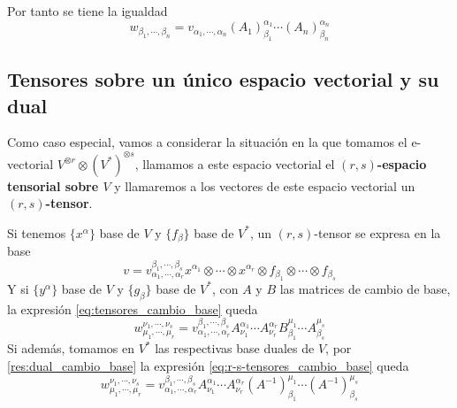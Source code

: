 Por tanto se tiene la igualdad
\begin{equation}
  \label{eq:tensores_cambio_base}
  w_{\beta_1,\cdots,\beta_n}=v_{\alpha_1,\cdots,\alpha_n}(A_1)^{\alpha_1}_{\beta_1}\cdots (A_n)^{\alpha_n}_{\beta_n}
\end{equation}

\subsection{Tensores sobre un único espacio vectorial y su dual}\label{subsec:tensores-sobre-un-único-espacio-vectorial-y-su-dual}
Como caso especial, vamos a considerar la situación en la que tomamos el e-vectorial
$V^{\otimes r}\otimes (V^*)^{\otimes s}$, llamamos a este espacio vectorial el \textbf{$(r,s)$-espacio tensorial sobre $V$}
y llamaremos a los vectores de este espacio vectorial un \textbf{$(r,s)$-tensor}.

Si tenemos $\{x^\alpha\}$ base de $V$ y $\{f_\beta\}$ base de $V^*$, un $(r,s)$-tensor se expresa en la base
\begin{equation}
  \label{eq:r-s-tensor-componentes}
  v=v_{\alpha_1,\cdots,\alpha_r}^{\beta_1,\cdots, \beta_s} x^{\alpha_1}\otimes\cdots\otimes x^{\alpha_r}\otimes f_{\beta_1}\otimes\cdots\otimes f_{\beta_s}
\end{equation}
Y si $\{y^\alpha\}$ base de $V$ y $\{g_\beta\}$ base de $V^*$, con $A$ y $B$ las matrices de cambio de base, la expresión \ref{eq:tensores_cambio_base}
queda
\begin{equation}
  \label{eq:r-s-tensores_cambio_base}
  w_{\mu_1,\cdots,\mu_r}^{\nu_1,\cdots, \nu_s}=v_{\alpha_1,\cdots,\alpha_r}^{\beta_1,\cdots, \beta_s}A^{\alpha_1}_{\nu_1}\cdots A^{\alpha_r}_{\nu_r}B_{\beta_1}^{\mu_1}\cdots A_{\beta_s}^{\mu_s}
\end{equation}
Si además, tomamos en $V^*$ las respectivas base duales de $V$, por \ref{res:dual_cambio_base} la expresión \ref{eq:r-s-tensores_cambio_base}
queda
\begin{equation}
  \label{eq:r-s-tensores_cambio_base_dual}
  w_{\mu_1,\cdots,\mu_r}^{\nu_1,\cdots, \nu_s}=v_{\alpha_1,\cdots,\alpha_r}^{\beta_1,\cdots, \beta_s}A^{\alpha_1}_{\nu_1}\cdots A^{\alpha_r}_{\nu_r}(A^{-1})_{\beta_1}^{\mu_1}\cdots (A^{-1})_{\beta_s}^{\mu_s}
\end{equation}